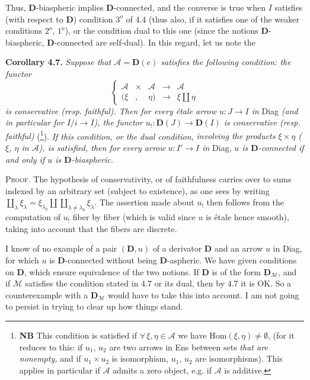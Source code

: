 \documentclass[11pt]{article}
\newcommand{\printedpage}[1]{\marginpar{\footnotesize p.~#1}}
\newcommand{\msp}[1]{\marginpar{\footnotesize [#1]}}
\newcommand{\D}{\mathbf{D}}
\begin{document}
Thus, $\D$-biaspheric implies $\D$-connected, and the converse is true when $I$ satisfies (with respect to $\D$) condition $3^o$ of 4.4 (thus also, if it satisfies one of the weaker conditions $2^o$, $1^o$), or the condition dual to this one (since the notions $\D$-biaspheric, $\D$-connected are self-dual). In this regard, let us note the

\textbf{Corollary 4.7.} \textit{Suppose that $\mathcal{A} = \D(e)$ satisfies the following condition: the functor}
\[
\left\{
\begin{array}{lcccl}
\mathcal{A} & \times & \mathcal{A} & \longrightarrow & \mathcal{A} \\[1ex]
(\xi & , & \eta) & \longrightarrow & \xi \amalg \eta
\end{array}
\right.
\]
\textit{is conservative (resp. faithful). Then for every étale arrow $u : J \longrightarrow I$ in} Diag \textit{(and in particular for $I/i \longrightarrow I$), the functor $u_! : \D(J) \longrightarrow \D(I)$ is conservative (resp. faithful)} (\footnote{\textbf{NB} This condition is satisfied if $\forall\, \xi, \eta \in \mathcal{A}$ we have $\mathrm{Hom}(\xi,\eta) \neq \emptyset$, (for it reduces to this: if $u_1$,
$u_2$ are two arrows in Ens between sets \textit{that are nonempty,} and if $u_1 \times u_2$ is isomorphism, $u_1$, $u_2$ are isomorphisms). This applies in particular if $\mathcal{A}$ admits a zero object, e.g. if $\mathcal{A}$ is additive.}). \textit{If this condition, or the dual condition,}
\printedpage{40}
\msp{page 64bis}
\textit{involving the products $\xi\times\eta$ ($\xi$, $\eta$ in $\mathcal{A}$), is satisfied, then for every arrow $u : I' \longrightarrow I$ in} Diag, \textit{$u$ is $\D$-connected if and only if $u$ is $\D$-biaspheric.}

\textsc{Proof.} The hypothesis of conservativity, or of faithfulness carries over to sums indexed by an arbitrary set (subject to existence), as one sees by writing $\coprod\limits_{\lambda} \xi_\lambda = \xi_{\lambda_0} \amalg \coprod\limits_{\lambda\neq\lambda_0} \xi_\lambda$. The assertion made about $u_!$ then follows from the computation of $u_!$ fiber by fiber (which is valid since $u$ is étale hence smooth), taking into account that the fibers are discrete.

I know of no example of a pair $(\D, u)$ of a derivator $\D$ and an arrow $u$ in Diag, for which $u$ is $\D$-connected without being $\D$-aspheric. We have given conditions on $\D$, which ensure equivalence of the two notions. If $\D$ is of the form $\D_{\mathcal{M}}$, and if $\mathcal{M}$ satisfies the condition stated in 4.7 or its dual, then by 4.7 it is OK. So a counterexample with a $\D_{\mathcal{M}}$ would have to take this into account. I am not going to persist in trying to clear up how things stand.
\end{document}
